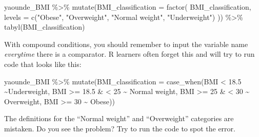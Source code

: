 \documentclass[
  letterpaper,
  DIV=11,
  numbers=noendperiod]{scrreprt}
\newenvironment{Shaded}{\begin{snugshade}}{\end{snugshade}}
\newcommand{\AttributeTok}[1]{\textcolor[rgb]{0.40,0.45,0.13}{#1}}
\newcommand{\DecValTok}[1]{\textcolor[rgb]{0.68,0.00,0.00}{#1}}
\newcommand{\ErrorTok}[1]{\textcolor[rgb]{0.68,0.00,0.00}{#1}}
\newcommand{\FloatTok}[1]{\textcolor[rgb]{0.68,0.00,0.00}{#1}}
\newcommand{\FunctionTok}[1]{\textcolor[rgb]{0.28,0.35,0.67}{#1}}
\newcommand{\NormalTok}[1]{\textcolor[rgb]{0.00,0.23,0.31}{#1}}
\newcommand{\SpecialCharTok}[1]{\textcolor[rgb]{0.37,0.37,0.37}{#1}}
\newcommand{\StringTok}[1]{\textcolor[rgb]{0.13,0.47,0.30}{#1}}
\begin{document}
\begin{Shaded}
\begin{Highlighting}[]
\NormalTok{yaounde\_BMI }\SpecialCharTok{\%\textgreater{}\%}
  \FunctionTok{mutate}\NormalTok{(}\AttributeTok{BMI\_classification =} \FunctionTok{factor}\NormalTok{(}
\NormalTok{    BMI\_classification,}
    \AttributeTok{levels =} \FunctionTok{c}\NormalTok{(}\StringTok{"Obese"}\NormalTok{,}
               \StringTok{"Overweight"}\NormalTok{,}
               \StringTok{"Normal weight"}\NormalTok{,}
               \StringTok{"Underweight"}\NormalTok{)}
\NormalTok{  )) }\SpecialCharTok{\%\textgreater{}\%}
  \FunctionTok{tabyl}\NormalTok{(BMI\_classification)}
\end{Highlighting}
\end{Shaded}

\begin{tcolorbox}[enhanced jigsaw, colframe=quarto-callout-caution-color-frame, rightrule=.15mm, opacityback=0, breakable, coltitle=black, colbacktitle=quarto-callout-caution-color!10!white, bottomrule=.15mm, leftrule=.75mm, toprule=.15mm, arc=.35mm, bottomtitle=1mm, colback=white, left=2mm, opacitybacktitle=0.6, titlerule=0mm, title=\textcolor{quarto-callout-caution-color}{\faFire}\hspace{0.5em}{Watch Out}, toptitle=1mm]

With compound conditions, you should remember to input the variable name
\emph{everytime} there is a comparator. R learners often forget this and
will try to run code that looks like this:

\begin{Shaded}
\begin{Highlighting}[]
\NormalTok{yaounde\_BMI }\SpecialCharTok{\%\textgreater{}\%}
  \FunctionTok{mutate}\NormalTok{(}\AttributeTok{BMI\_classification =} \FunctionTok{case\_when}\NormalTok{(BMI }\SpecialCharTok{\textless{}} \FloatTok{18.5} \SpecialCharTok{\textasciitilde{}}\StringTok{\textquotesingle{}Underweight\textquotesingle{}}\NormalTok{,}
\NormalTok{                                        BMI }\SpecialCharTok{\textgreater{}=} \FloatTok{18.5} \SpecialCharTok{\&} \ErrorTok{\textless{}} \DecValTok{25} \SpecialCharTok{\textasciitilde{}} \StringTok{\textquotesingle{}Normal weight\textquotesingle{}}\NormalTok{,}
\NormalTok{                                        BMI }\SpecialCharTok{\textgreater{}=} \DecValTok{25} \SpecialCharTok{\&} \ErrorTok{\textless{}} \DecValTok{30} \SpecialCharTok{\textasciitilde{}} \StringTok{\textquotesingle{}Overweight\textquotesingle{}}\NormalTok{,}
\NormalTok{                                        BMI }\SpecialCharTok{\textgreater{}=} \DecValTok{30} \SpecialCharTok{\textasciitilde{}} \StringTok{\textquotesingle{}Obese\textquotesingle{}}\NormalTok{))}
\end{Highlighting}
\end{Shaded}

The definitions for the ``Normal weight'' and ``Overweight'' categories
are mistaken. Do you see the problem? Try to run the code to spot the
error.

\end{tcolorbox}
\end{document}
